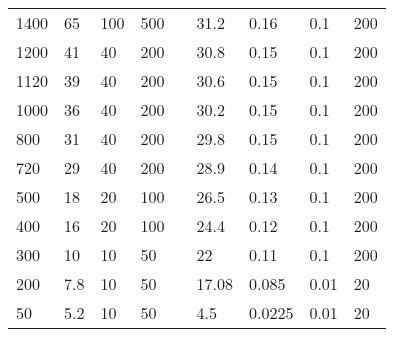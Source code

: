 \documentclass{article}
\begin{document}
\begin{table}[H]
\begin{tabular}{|l|l|l|l|l|l|l|l|l|}
        1400          & 65                        & 100                       & 500                       &  & 31.2       & 0.16                      & 0.1                       & 200                       \\ \cline{1-4} \cline{6-9}
        1200          & 41                        & 40                        & 200                       &  & 30.8       & 0.15                      & 0.1                       & 200                       \\ \cline{1-4} \cline{6-9}
        1120          & 39                        & 40                        & 200                       &  & 30.6       & 0.15                      & 0.1                       & 200                       \\ \cline{1-4} \cline{6-9}
        1000          & 36                        & 40                        & 200                       &  & 30.2       & 0.15                      & 0.1                       & 200                       \\ \cline{1-4} \cline{6-9}
        800           & 31                        & 40                        & 200                       &  & 29.8       & 0.15                      & 0.1                       & 200                       \\ \cline{1-4} \cline{6-9}
        720           & 29                        & 40                        & 200                       &  & 28.9       & 0.14                      & 0.1                       & 200                       \\ \cline{1-4} \cline{6-9}
        500           & 18                        & 20                        & 100                       &  & 26.5       & 0.13                      & 0.1                       & 200                       \\ \cline{1-4} \cline{6-9}
        400           & 16                        & 20                        & 100                       &  & 24.4       & 0.12                      & 0.1                       & 200                       \\ \cline{1-4} \cline{6-9}
        300           & 10                        & 10                        & 50                        &  & 22         & 0.11                      & 0.1                       & 200                       \\ \cline{1-4} \cline{6-9}
        200           & 7.8                       & 10                        & 50                        &  & 17.08      & 0.085                     & 0.01                      & 20                        \\ \cline{1-4} \cline{6-9}
        50            & 5.2                       & 10                        & 50                        &  & 4.5        & 0.0225                    & 0.01                      & 20                        \\ \cline{1-4} \cline{6-9}
    \end{tabular}
\end{table}
\end{document}
